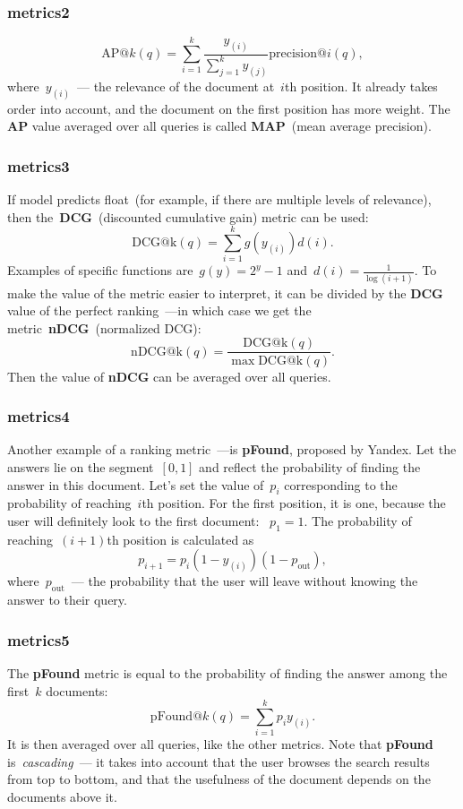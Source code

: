 \documentclass{beamer}
\begin{document}
\begin{frame}
\frametitle{metrics2}
\[
    \text{AP}@k(q)
    =
    \sum_{i = 1}^{k}
        \frac{
            y_{(i)}
        }{
            \sum_{j = 1}^{k} y_{(j)}
        }
        \text{precision}@i(q),
\]
where~$y_{(i)}$~--- the relevance of the document at~$i$th position.
It already takes order into account, and the document on the first position has more weight.
The \textbf{AP} value averaged over all queries is called \textbf{MAP}~(mean average precision).
\end{frame}
\begin{frame}
\frametitle{metrics3}
If model predicts float~(for example, if there are multiple levels of relevance),
then the~\textbf{DCG}~(discounted cumulative gain) metric can be used:
\[
    \text{DCG@k}(q)
    =
    \sum_{i = 1}^{k}
        g(y_{(i)}) d(i).
\]
Examples of specific functions are~$g(y) = 2^{y} - 1$ and~$d(i) = \frac{1}{\log(i + 1)}$.
To make the value of the metric easier to interpret, it can be divided by the \textbf{DCG} value
of the perfect ranking~---in which case we get the metric~\textbf{nDCG}~(normalized DCG):
\[
    \text{nDCG@k}(q)
    =
    \frac{
        \text{DCG@k}(q)
    }{
        \max \text{DCG@k}(q)
    }.
\]
Then the value of \textbf{nDCG} can be averaged over all queries.
\end{frame}
\begin{frame}
\frametitle{metrics4}
Another example of a ranking metric~---is \textbf{pFound}, proposed by Yandex.
Let the answers lie on the segment~$[0, 1]$ and reflect the probability of finding the answer in this document.
Let's set the value of~$p_i$ corresponding to the probability of reaching~$i$th position.
For the first position, it is one, because the user will definitely look
to the first document: ~$p_1 = 1$.
The probability of reaching~$(i+1)$th position is calculated as
\[
    p_{i + 1}
    =
    p_i
    (1 - y_{(i)})
    (1 - p_\text{out}),
\]
where~$p_\text{out}$~--- the probability that the user
will leave without knowing the answer to their query.

\end{frame}
\begin{frame}
\frametitle{metrics5}
The \textbf{pFound} metric is equal to the probability of finding the answer among the first~$k$ documents:
\[
    \text{pFound}@k(q)
    =
    \sum_{i = 1}^{k}
        p_i y_{(i)}.
\]
It is then averaged over all queries, like the other metrics.
Note that \textbf{pFound} is~\emph{cascading}~---
it takes into account that the user browses the search results
from top to bottom, and that the usefulness of the document depends on the documents above it.
\end{frame}
\end{document}
